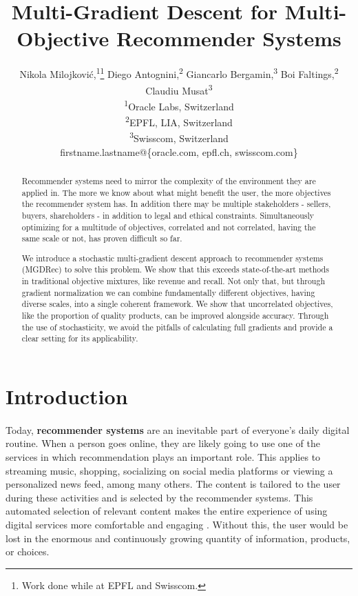 \documentclass[letterpaper]{article}
\begin{document}
\title{Multi-Gradient Descent for Multi-Objective Recommender Systems}
\author{Nikola Milojkovi\'c,\textsuperscript{\rm 1}\thanks{Work done while at EPFL and Swisscom.} Diego Antognini,\textsuperscript{\rm 2} Giancarlo Bergamin,\textsuperscript{\rm 3} Boi Faltings,\textsuperscript{\rm 2} Claudiu Musat\textsuperscript{\rm 3}\\
\textsuperscript{\rm 1}Oracle Labs, Switzerland\\
\textsuperscript{\rm 2}EPFL, LIA, Switzerland\\
\textsuperscript{\rm 3}Swisscom, Switzerland\\
firstname.lastname@\{oracle.com, epfl.ch, swisscom.com\}
}
\maketitle


\begin{abstract}
Recommender systems need to mirror the complexity of the environment they are applied in. The more we know about what might benefit the user, the more objectives the recommender system has. In addition there may be multiple stakeholders - sellers, buyers, shareholders - in addition to legal and ethical constraints. Simultaneously optimizing for a multitude of objectives, correlated and not correlated, having the same scale or not, has proven difficult so far. 

We introduce a stochastic multi-gradient descent approach to recommender systems (MGDRec) to solve this problem. We show that this exceeds state-of-the-art methods in traditional objective mixtures, like revenue and recall. Not only that, but through gradient normalization we can combine fundamentally different objectives, having diverse scales, into a single coherent framework. We show that uncorrelated objectives, like the proportion of quality products, can be improved alongside accuracy. 
Through the use of stochasticity, we avoid the pitfalls of calculating full gradients and provide a clear setting for its applicability.


\end{abstract}

\section{Introduction}
\paragraph{}
Today, \textbf{recommender systems} are an inevitable part of everyone's daily digital routine. When a person goes online, they are likely going to use one of the services in which recommendation plays an important role. This applies to streaming music, shopping, socializing on social media platforms or viewing a personalized news feed,
among many others. The content is tailored to the user during these activities and is selected by the recommender systems. This automated selection of relevant content makes the entire experience of using digital services more comfortable and engaging \cite{Knijnenburg2012}. Without this, the user would be lost in the enormous and continuously growing quantity of information, products, or choices.
\end{document}
